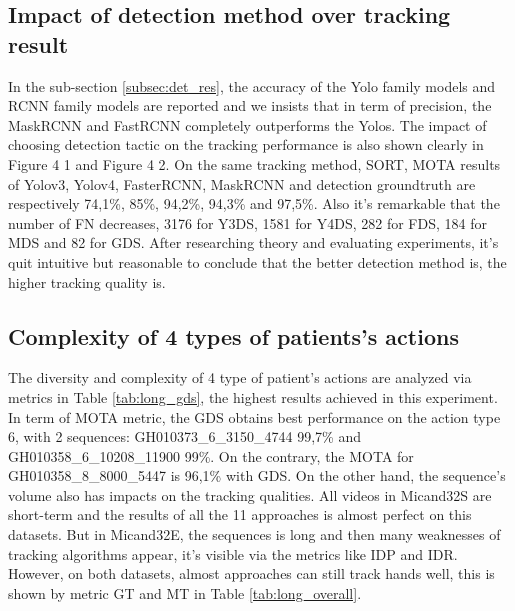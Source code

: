 \subsection{Impact of detection method over tracking result}
In the sub-section \ref{subsec:det_res}, the accuracy of the Yolo family models and RCNN family models are reported and we insists that in term of precision, the MaskRCNN and FastRCNN completely outperforms the Yolos. The impact of choosing detection tactic on the tracking performance is also shown clearly in Figure 4 1 and Figure 4 2. On the same tracking method, SORT, MOTA results of Yolov3, Yolov4, FasterRCNN, MaskRCNN and detection groundtruth are respectively 74,1\%, 85\%, 94,2\%, 94,3\% and 97,5\%. Also it’s remarkable that the number of FN decreases, 3176 for Y3DS, 1581 for Y4DS, 282 for FDS, 184 for MDS and 82 for GDS. After researching theory and evaluating experiments, it’s quit intuitive but reasonable to conclude that the better detection method is, the higher tracking quality is.
\subsection{Complexity of 4 types of patients's actions}
The diversity and complexity of 4 type of patient’s actions are analyzed via metrics in Table \ref{tab:long_gds}, the highest results achieved in this experiment. In term of MOTA metric, the GDS obtains best performance on the action type 6, with 2 sequences:  GH010373\_6\_3150\_4744 99,7\% and GH010358\_6\_10208\_11900 99\%. On the contrary, the MOTA for GH010358\_8\_8000\_5447 is 96,1\% with GDS.
On the other hand, the sequence’s volume also has impacts on the tracking qualities. All videos in Micand32S are short-term and the results of all the 11 approaches is almost perfect on this datasets. But in Micand32E, the sequences is long and then many weaknesses of tracking algorithms appear, it’s visible via the metrics like IDP and IDR. However, on both datasets, almost approaches can still track hands well, this is shown by metric GT and MT in Table \ref{tab:long_overall}.

